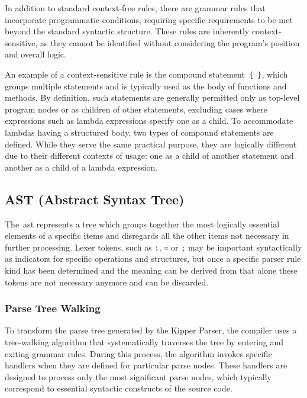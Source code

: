 In addition to standard context-free rules, there are grammar rules that incorporate programmatic conditions, requiring specific requirements to be met beyond the standard syntactic structure. These rules are inherently context-sensitive, as they cannot be identified without considering the program’s position and overall logic.

An example of a context-sensitive rule is the compound statement~\lstinline|{ }|, which groups multiple statements and is typically used as the body of functions and methods. By definition, such statements are generally permitted only as top-level program nodes or as children of other statements, excluding cases where expressions such as lambda expressions specify one as a child. To accommodate lambdas having a structured body, two types of compound statements are defined. While they serve the same practical purpose, they are logically different due to their different contexts of usage: one as a child of another statement and another as a child of a lambda expression.

\subsection{AST (Abstract Syntax Tree)}
\label{sec:translation-to-the-ast}

The~\acrshort{ast} represents a tree which groups together the most logically essential elements of a specific items and disregards all the other items not necessary in further processing. Lexer tokens, such as \lstinline|:|, \lstinline|=| or \lstinline|;| may be important syntactically as indicators for specific operations and structures, but once a specific parser rule kind has been determined and the meaning can be derived from that alone these tokens are not necessary anymore and can be discarded.

\subsubsection{Parse Tree Walking}

To transform the parse tree generated by the Kipper Parser, the compiler uses a tree-walking algorithm that systematically traverses the tree by entering and exiting grammar rules. During this process, the algorithm invokes specific handlers when they are defined for particular parse nodes. These handlers are designed to process only the most significant parse nodes, which typically correspond to essential syntactic constructs of the source code.

